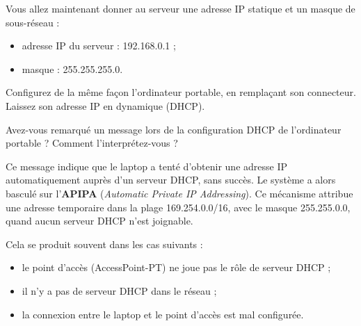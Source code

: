\documentclass[
  french,
  10pt,
  a4paper,
]{scrartcl}
\providecommand{\tightlist}{%
  \setlength{\itemsep}{0pt}\setlength{\parskip}{0pt}}
\begin{document}
Vous allez maintenant donner au serveur une adresse IP statique et un
masque de sous-réseau :

\begin{itemize}
\tightlist
\item
  adresse IP du serveur : 192.168.0.1 ;
\item
  masque : 255.255.255.0.
\end{itemize}

Configurez de la même façon l'ordinateur portable, en remplaçant son
connecteur. Laissez son adresse IP en dynamique (DHCP).

\begin{tcolorbox}[enhanced jigsaw, arc=.35mm, bottomrule=.15mm, bottomtitle=1mm, breakable, colback=white, colbacktitle=quarto-callout-note-color!10!white, colframe=quarto-callout-note-color-frame, coltitle=black, left=2mm, leftrule=.75mm, opacityback=0, opacitybacktitle=0.6, rightrule=.15mm, title=\textcolor{quarto-callout-note-color}{\faInfo}\hspace{0.5em}{Question 2}, titlerule=0mm, toprule=.15mm, toptitle=1mm]

Avez-vous remarqué un message lors de la configuration DHCP de
l'ordinateur portable ? Comment l'interprétez-vous ?

\end{tcolorbox}

\begin{tcolorbox}[enhanced jigsaw, arc=.35mm, bottomrule=.15mm, bottomtitle=1mm, breakable, colback=white, colbacktitle=quarto-callout-tip-color!10!white, colframe=quarto-callout-tip-color-frame, coltitle=black, left=2mm, leftrule=.75mm, opacityback=0, opacitybacktitle=0.6, rightrule=.15mm, title=\textcolor{quarto-callout-tip-color}{\faLightbulb}\hspace{0.5em}{Explication du message « DHCP failed. APIPA is being used » (à lire
après avoir répondu)}, titlerule=0mm, toprule=.15mm, toptitle=1mm]

Ce message indique que le laptop a tenté d'obtenir une adresse IP
automatiquement auprès d'un serveur DHCP, sans succès. Le système a
alors basculé sur l'\textbf{APIPA} (\emph{Automatic Private IP
Addressing}). Ce mécanisme attribue une adresse temporaire dans la plage
169.254.0.0/16, avec le masque 255.255.0.0, quand aucun serveur DHCP
n'est joignable.

Cela se produit souvent dans les cas suivants :

\begin{itemize}
\tightlist
\item
  le point d'accès (AccessPoint-PT) ne joue pas le rôle de serveur DHCP
  ;
\item
  il n'y a pas de serveur DHCP dans le réseau ;
\item
  la connexion entre le laptop et le point d'accès est mal configurée.
\end{itemize}

\end{tcolorbox}
\end{document}
